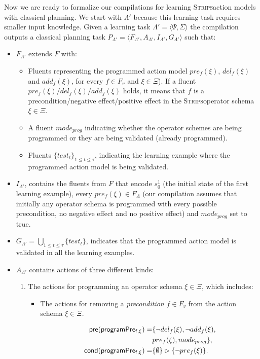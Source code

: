 \documentclass[letterpaper]{article} %
\newcommand{\tup}[1]{{\langle #1 \rangle}}
\newcommand{\pre}{\mathsf{pre}}     %
\newcommand{\cond}{\mathsf{cond}}   %
\newcommand{\strips}{\textsc{Strips}}     %
\begin{document}
Now we are ready to formalize our compilations for learning \strips action models with classical planning. We start with $\Lambda'$ because this learning task requires smaller input knowledge. Given a learning task $\Lambda'=\tup{\Psi,\Sigma}$ the compilation outputs a classical planning task $P_{\Lambda'}=\tup{F_{\Lambda'},A_{\Lambda'},I_{\Lambda'},G_{\Lambda'}}$ such that:
\begin{itemize}
\item $F_{\Lambda'}$ extends $F$ with:
\begin{itemize}
\item Fluents representing the programmed action model $pre_f(\xi)$, $del_f(\xi)$ and $add_f(\xi)$, for every $f\in F_v$ and $\xi \in \Xi$). If a fluent $pre_f(\xi)/del_f(\xi)/add_f(\xi)$ holds, it means that $f$ is a precondition/negative effect/positive effect in the \strips operator schema $\xi\in \Xi$.
\item A fluent $mode_{prog}$ indicating whether the operator schemes are being programmed or they are being validated (already programmed).
\item Fluents $\{test_t\}_{1\leq t\leq \tau}$, indicating the learning example where the programmed action model is being validated.
\end{itemize}
\item $I_{\Lambda'}$, contains the fluents from $F$ that encode $s_0^1$ (the initial state of the first learning example), every $pre_f(\xi)\in F_{\Lambda}$ (our compilation assumes that initially any operator schema is programmed with every possible precondition, no negative effect and no positive effect) and $mode_{prog}$ set to true.
\item $G_{\Lambda'}=\bigcup_{1\leq t\leq \tau}\{test_t\}$, indicates that the programmed action model is validated in all the learning examples.
\item $A_{\Lambda'}$ contains actions of three different kinds:
\begin{enumerate}
\item The actions for programming an operator schema $\xi\in\Xi$, which includes:
\begin{itemize}
\item The actions for removing a {\em precondition} $f\in F_v$ from the action schema $\xi\in\Xi$.

\begin{small}
\begin{align*}
\hspace*{7pt}\pre(\mathsf{programPre_{f,\xi}})=&\{\neg del_{f}(\xi),\neg add_{f}(\xi),\\
& pre_{f}(\xi), mode_{prog}\},\\
\cond(\mathsf{programPre_{f,\xi}})=&\{\emptyset\}\rhd\{\neg pre_{f}(\xi)\}.
\end{align*}
\end{small}


\end{itemize}
\end{enumerate}
\end{itemize}
\end{document}
